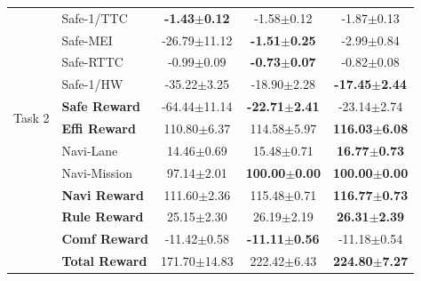 {\begin{longtable}{l l c c c}
  \multirow{10}{*}{Task 2}
  & Safe-1/TTC       & \textbf{-1.43$\pm$0.12} & -1.58$\pm$0.12 & -1.87$\pm$0.13 \\
  & Safe-MEI         & -26.79$\pm$11.12 & \textbf{-1.51$\pm$0.25} & -2.99$\pm$0.84 \\
  & Safe-RTTC        & -0.99$\pm$0.09 & \textbf{-0.73$\pm$0.07} & -0.82$\pm$0.08 \\
  & Safe-1/HW        & -35.22$\pm$3.25 & -18.90$\pm$2.28 & \textbf{-17.45$\pm$2.44} \\
  & \textbf{Safe Reward} & -64.44$\pm$11.14 & \textbf{-22.71$\pm$2.41} & -23.14$\pm$2.74 \\
  & \textbf{Effi Reward} & 110.80$\pm$6.37 & 114.58$\pm$5.97 & \textbf{116.03$\pm$6.08} \\
  & Navi-Lane        & 14.46$\pm$0.69 & 15.48$\pm$0.71 & \textbf{16.77$\pm$0.73} \\
  & Navi-Mission     & 97.14$\pm$2.01 & \textbf{100.00$\pm$0.00} & \textbf{100.00$\pm$0.00} \\
  & \textbf{Navi Reward} & 111.60$\pm$2.36 & 115.48$\pm$0.71 & \textbf{116.77$\pm$0.73} \\
  & \textbf{Rule Reward} & 25.15$\pm$2.30 & 26.19$\pm$2.19 & \textbf{26.31$\pm$2.39} \\
  & \textbf{Comf Reward} & -11.42$\pm$0.58 & \textbf{-11.11$\pm$0.56} & -11.18$\pm$0.54 \\
  & \textbf{Total Reward} & 171.70$\pm$14.83 & 222.42$\pm$6.43 & \textbf{224.80$\pm$7.27} \\
  \midrule


\end{longtable}}
